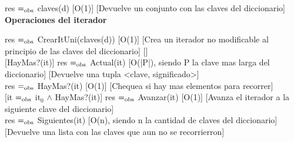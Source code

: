{res $=_{\mathrm{obs}}$ claves(d)}
[O(1)]
[Devuelve un conjunto con las claves del diccionario]\\

\bf{Operaciones del iterador}

{res $=_{\mathrm{obs}}$ CrearItUni(claves(d))}
[O(1)]
[Crea un iterador no modificable al principio de las claves del diccionario]
[]\\

[HayMas?(it)]
{res $=_{\mathrm{obs}}$ Actual(it)}
[O(|P|), siendo P la clave mas larga del diccionario]
[Devuelve una tupla <clave, significado>]\\

{res $=_{\mathrm{obs}}$ HayMas?(it)}
[O(1)]
[Chequea si hay mas elementos para recorrer]\\

[it $=_{\mathrm{obs}}$ it$_0$ $\wedge$ HayMas?(it)]
{res $=_{\mathrm{obs}}$ Avanzar(it)}
[O(1)]
[Avanza el iterador a la siguiente clave del diccionario]\\

{res $=_{\mathrm{obs}}$ Siguientes(it)}
[O(n), siendo n la cantidad de claves del diccionario]
[Devuelve una lista con las claves que aun no se recorrierron]\\

